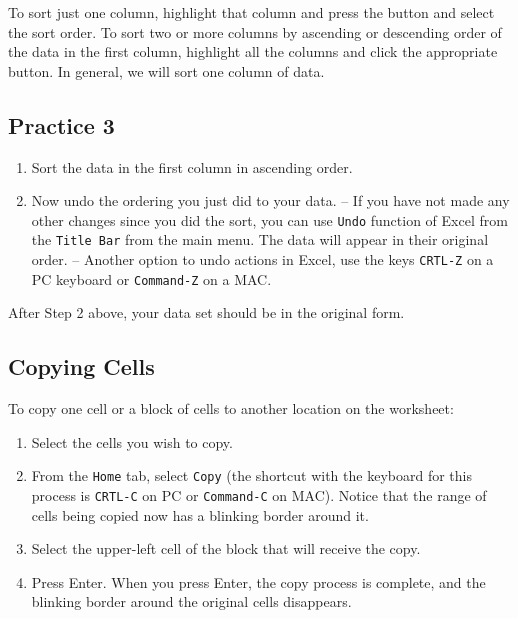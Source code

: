 \documentclass[
]{book}
\providecommand{\tightlist}{%
  \setlength{\itemsep}{0pt}\setlength{\parskip}{0pt}}
\begin{document}
To sort just one column, highlight that column and press the button and select the sort order. To sort two or more columns by ascending or descending order of the data in the first column, highlight all the columns and click the appropriate button. In general, we will sort one column of data.

\hypertarget{practice-3}{%
\subsection{Practice 3}\label{practice-3}}

\begin{enumerate}
\def\labelenumi{\arabic{enumi}.}
\tightlist
\item
  Sort the data in the first column in ascending order.
\item
  Now undo the ordering you just did to your data.
  -- If you have not made any other changes since you did the sort, you can use \texttt{Undo} function of Excel from the \texttt{Title\ Bar} from the main menu. The data will appear in their original order.
  -- Another option to undo actions in Excel, use the keys \texttt{CRTL-Z} on a PC keyboard or \texttt{Command-Z} on a MAC.
\end{enumerate}

After Step 2 above, your data set should be in the original form.

\hypertarget{copying-cells}{%
\subsection{Copying Cells}\label{copying-cells}}

To copy one cell or a block of cells to another location on the worksheet:

\begin{enumerate}
\def\labelenumi{\arabic{enumi}.}
\tightlist
\item
  Select the cells you wish to copy.
\item
  From the \texttt{Home} tab, select \texttt{Copy} (the shortcut with the keyboard for this process is \texttt{CRTL-C} on PC or \texttt{Command-C} on MAC). Notice that the range of cells being copied now has a blinking border around it.
\item
  Select the upper-left cell of the block that will receive the copy.
\item
  Press Enter. When you press Enter, the copy process is complete, and the blinking border around the original cells disappears.
\end{enumerate}
\end{document}
